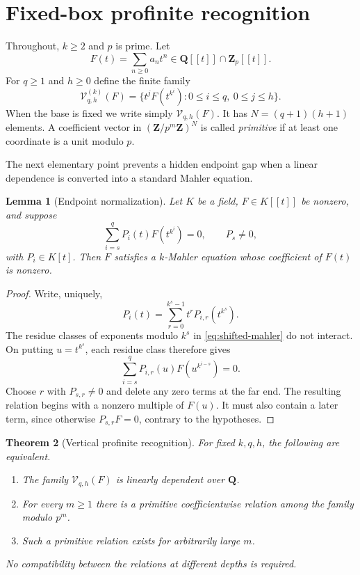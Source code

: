 \documentclass[11pt,reqno]{amsart}
\newtheorem{theorem}{Theorem}[section]
\newtheorem{lemma}[theorem]{Lemma}
\theoremstyle{definition}
\theoremstyle{remark}
\newcommand{\Q}{\mathbf Q}
\newcommand{\Z}{\mathbf Z}
\newcommand{\Zp}{\mathbf Z_p}
\begin{document}
\section{Fixed-box profinite recognition}

Throughout, $k\geq2$ and $p$ is prime.  Let
\[
 F(t)=\sum_{n\geq0}a_nt^n\in\Q[[t]]\cap\Zp[[t]].
\]
For $q\geq1$ and $h\geq0$ define the finite family
\begin{equation}\label{eq:box-family}
 \mathcal V^{(k)}_{q,h}(F)=
 \{t^jF(t^{k^i}):0\leq i\leq q,\ 0\leq j\leq h\}.
\end{equation}
When the base is fixed we write simply $\mathcal V_{q,h}(F)$.
It has $N=(q+1)(h+1)$ elements.  A coefficient vector in
$(\Z/p^m\Z)^N$ is called \emph{primitive} if at least one coordinate is a
unit modulo $p$.

The next elementary point prevents a hidden endpoint gap when a linear
dependence is converted into a standard Mahler equation.

\begin{lemma}[Endpoint normalization]\label{lem:endpoint}
Let $K$ be a field, $F\in K[[t]]$ be nonzero, and suppose
\begin{equation}\label{eq:shifted-mahler}
 \sum_{i=s}^{q}P_i(t)F(t^{k^i})=0,
 \qquad P_s\ne0,
\end{equation}
with $P_i\in K[t]$.  Then $F$ satisfies a $k$-Mahler equation whose
coefficient of $F(t)$ is nonzero.
\end{lemma}

\begin{proof}
Write, uniquely,
\[
 P_i(t)=\sum_{r=0}^{k^s-1}t^rP_{i,r}(t^{k^s}).
\]
The residue classes of exponents modulo $k^s$ in
\eqref{eq:shifted-mahler} do not interact.  On putting $u=t^{k^s}$, each
residue class therefore gives
\[
 \sum_{i=s}^{q}P_{i,r}(u)F(u^{k^{i-s}})=0.
\]
Choose $r$ with $P_{s,r}\ne0$ and delete any zero terms at the far end.
The resulting relation begins with a nonzero multiple of $F(u)$.  It must
also contain a later term, since otherwise $P_{s,r}F=0$, contrary to the
hypotheses.
\end{proof}

\begin{theorem}[Vertical profinite recognition]\label{thm:vertical}
For fixed $k,q,h$, the following are equivalent.
\begin{enumerate}[label=\textup{(\roman*)}]
\item The family $\mathcal V_{q,h}(F)$ is linearly dependent over $\Q$.
\item For every $m\geq1$ there is a primitive coefficientwise relation among
      the family modulo $p^m$.
\item Such a primitive relation exists for arbitrarily large $m$.
\end{enumerate}
No compatibility between the relations at different depths is required.
\end{theorem}
\end{document}
